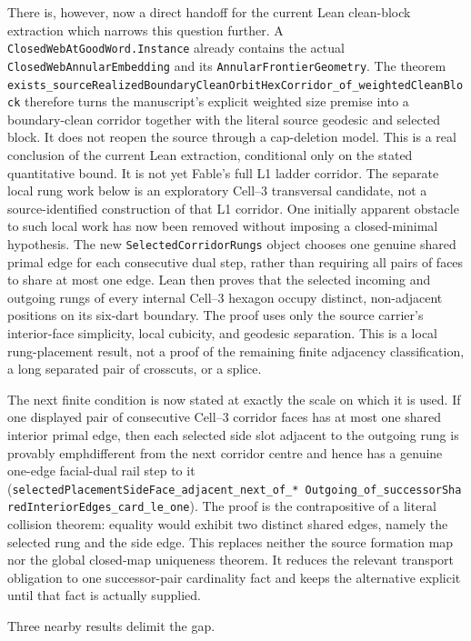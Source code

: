 \documentclass[11pt]{article}
\theoremstyle{definition}
\begin{document}
There is, however, now a direct handoff for the current Lean clean-block
extraction which narrows this question further.
A \texttt{ClosedWebAtGoodWord.Instance} already contains the actual
\texttt{ClosedWebAnnularEmbedding} and its \texttt{AnnularFrontierGeometry}.
The theorem
\texttt{exists\_sourceRealizedBoundaryCleanOrbitHexCorridor\_of\_weightedCleanBlock}
therefore turns the manuscript's explicit weighted size premise into a
boundary-clean corridor together with the literal source geodesic and selected
block.  It does not reopen the source through a cap-deletion model.  This is a
real conclusion of the current Lean extraction, conditional only on the stated
quantitative bound.  It is not yet Fable's full L1 ladder corridor.  The
separate local rung work below is an exploratory Cell--3 transversal candidate,
not a source-identified construction of that L1 corridor.  One initially
apparent obstacle to such local work has now been removed
without imposing a closed-minimal hypothesis.  The new
\texttt{SelectedCorridorRungs} object chooses one genuine shared primal edge
for each consecutive dual step, rather than requiring all pairs of faces to
share at most one edge.  Lean then proves that the selected incoming and
outgoing rungs of every internal Cell--3 hexagon occupy distinct,
non-adjacent positions on its six-dart boundary.  The proof uses only the
source carrier's interior-face simplicity, local cubicity, and geodesic
separation.  This is a local rung-placement result, not a proof of the
remaining finite adjacency classification, a long separated pair of
crosscuts, or a splice.

The next finite condition is now stated at exactly the scale on which it is
used.  If one displayed pair of consecutive Cell--3 corridor faces has at
most one shared interior primal edge, then each selected side slot adjacent
to the outgoing rung is provably emph{different} from the next corridor
centre and hence has a genuine one-edge facial-dual rail step to it
(\texttt{selectedPlacementSideFace\_adjacent\_next\_of\_*\
Outgoing\_of\_successorSharedInteriorEdges\_card\_le\_one}).  The proof is
the contrapositive of a literal collision theorem: equality would exhibit two
distinct shared edges, namely the selected rung and the side edge.  This
replaces neither the source formation map nor the global closed-map
uniqueness theorem.  It reduces the relevant transport obligation to one
successor-pair cardinality fact and keeps the alternative explicit until that
fact is actually supplied.

Three nearby results delimit the gap.
\end{document}
